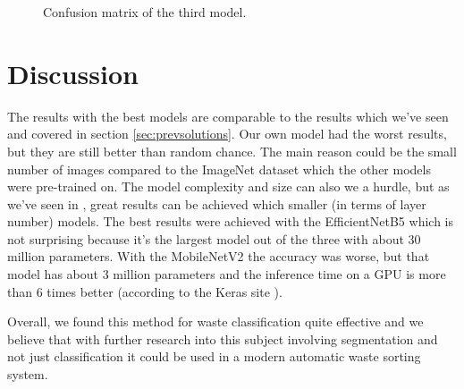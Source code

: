 \documentclass[twocolumn]{article}
\begin{document}
	\begin{figure}[htb]
		
		\centering
		\caption{Confusion matrix of the third model.}
		\label{fig:model3_conf}
	\end{figure}
	
	\section{Discussion}
	The results with the best models are comparable to the results which we've seen and covered in section \ref{sec:prevsolutions}.
	Our own model had the worst results, but they are still better than random chance. The main reason could be the small number of images compared to the ImageNet dataset which the other models were pre-trained on. The model complexity and size can also we a hurdle, but as we've seen in \cite{Chu2018}, great results can be achieved which smaller (in terms of layer number) models.
	The best results were achieved with the EfficientNetB5 which is not surprising because it's the largest model out of the three with about 30 million parameters. With the MobileNetV2 the accuracy was worse, but that model has about 3 million parameters and the inference time on a GPU is more than 6 times better (according to the Keras site \cite{keras_applications}).
	
	Overall, we found this method for waste classification quite effective and we believe that with further research into this subject involving segmentation and not just classification it could be used in a modern automatic waste sorting system.
	
	
	
	
\end{document}
